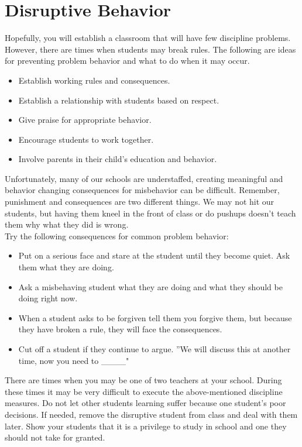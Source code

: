 \section{Disruptive Behavior}
Hopefully, you will establish a classroom that will have few discipline problems.  However, there are times when students may break rules.  The following are ideas for preventing problem behavior and what to do when it may occur.

\begin{itemize}
 \item Establish working rules and consequences.
 \item Establish a relationship with students based on respect.
 \item Give praise for appropriate behavior.
 \item Encourage students to work together.
 \item Involve parents in their child's education and behavior.
\end{itemize}

Unfortunately, many of our schools are understaffed, creating meaningful and behavior changing consequences for misbehavior can be difficult.  Remember, punishment and consequences are two different things.  We may not hit our students, but having them kneel in the front of class or do pushups doesn't teach them why what they did is wrong.\\  

Try the following consequences for common problem behavior:
\begin{itemize}
 \item Put on a serious face and stare at the student until they become quiet. Ask them what they are doing.
 \item Ask a misbehaving student what they are doing and what they should be doing right now.
 \item When a student asks to be forgiven tell them you forgive them, but because they have broken a rule, they will face the consequences.
 \item Cut off a student if they continue to argue. ''We will discuss this at another time, now you need to \_\_\_\_"
\end{itemize}

There are times when you may be one of two teachers at your school.  During these times it may be very difficult to execute the above-mentioned discipline measures.  Do not let other students learning suffer because one student's poor decisions.  If needed, remove the disruptive student from class and deal with them later.  Show your students that it is a privilege to study in school and one they should not take for granted.


